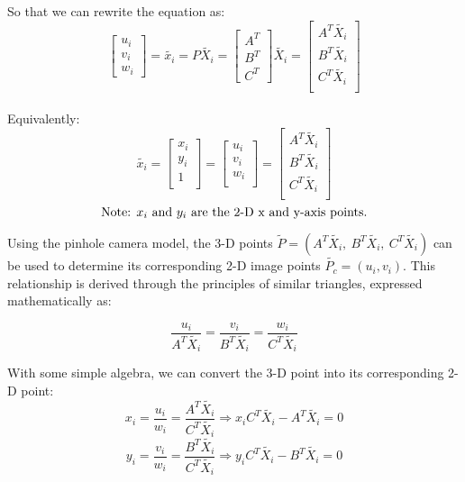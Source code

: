 \documentclass[12pt]{article}
\begin{document}
\noindent So that we can rewrite the equation as:
\[
\begin{bmatrix}
u_{i} \\ v_{i} \\ w_{i}
\end{bmatrix} = \tilde{x_i}=P\tilde{X_i} = 
\begin{bmatrix}
A^{T} \\ B^{T} \\ C^{T}
\end{bmatrix} \tilde{X_i} = 
\begin{bmatrix}
A^T \tilde{X_i} \\
B^T \tilde{X_i} \\
C^T \tilde{X_i} \\
\end{bmatrix}
\]\\

\noindent Equivalently:
\[
\tilde{x_i} = 
\begin{bmatrix}
x_i \\
y_i \\
1 \\
\end{bmatrix} = 
\begin{bmatrix}
u_i \\
v_i \\
w_i \\
\end{bmatrix} = 
\begin{bmatrix}
A^T \tilde{X_i} \\
B^T \tilde{X_i} \\
C^T \tilde{X_i} \\
\end{bmatrix}
\]
\[
\text{Note: \( x_i \) and \( y_i \) are the 2-D x and y-axis points.}
\]

\noindent Using the pinhole camera model, the 3-D points \( \tilde{P} = (A^T \tilde{X_i},\ B^T \tilde{X_i},\ C^T \tilde{X_i}) \) can be used to determine its corresponding 2-D image points \( \tilde{P_c} = (u_i, v_i) \). This relationship is derived through the principles of similar triangles, expressed mathematically as:

\[
\frac{u_i}{A^T \tilde{X_i}} = \frac{v_i}{B^T \tilde{X_i}} = \frac{w_i}{C^T \tilde{X_i}}
\]

\noindent With some simple algebra, we can convert the 3-D point into its corresponding 2-D point: \\
\[
x_i = \frac{u_i}{w_i} = \frac{A^T \tilde{X_i}}{C^T \tilde{X_i}} \Longrightarrow x_i C^T \tilde{X_i} - A^T \tilde{X_i} = 0
\]
\[
y_i = \frac{v_i}{w_i} = \frac{B^T \tilde{X_i}}{C^T \tilde{X_i}} \Longrightarrow y_i C^T \tilde{X_i} - B^T \tilde{X_i} = 0
\]
\end{document}
